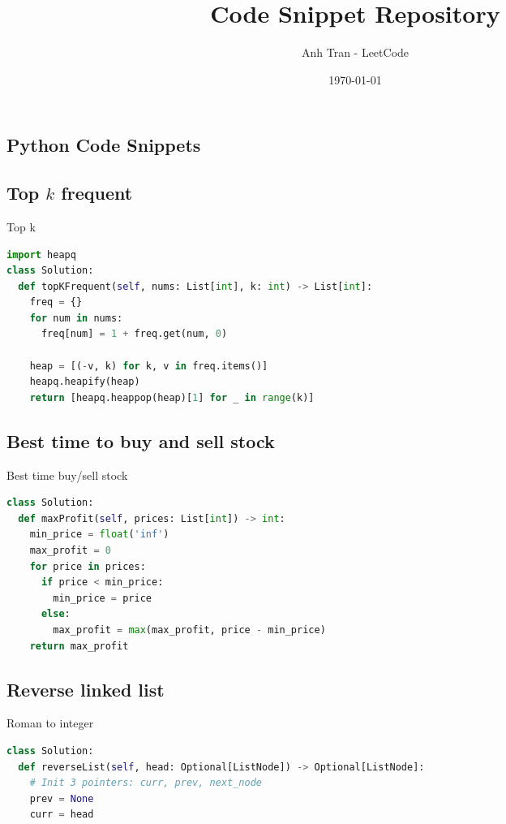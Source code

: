 \documentclass[a4paper,12pt]{article}
\title{Code Snippet Repository}
\author{Anh Tran - LeetCode}
\date{\today}
\begin{document}
\maketitle

\begin{multicols}{2}

\section{Python Code Snippets}

\subsection{Top $k$ frequent}

\begin{mycode}[label={lst:top-k}]{Top k}
\begin{lstlisting}[language=Python]
import heapq
class Solution:
  def topKFrequent(self, nums: List[int], k: int) -> List[int]:
    freq = {}
    for num in nums:
      freq[num] = 1 + freq.get(num, 0)

    heap = [(-v, k) for k, v in freq.items()]
    heapq.heapify(heap)
    return [heapq.heappop(heap)[1] for _ in range(k)]
\end{lstlisting}
\end{mycode}

\subsection{Best time to buy and sell stock}

\begin{mycode}[label={lst:best-time-buy-sell-stock}]{Best time buy/sell stock}
\begin{lstlisting}[language=Python]
class Solution:
  def maxProfit(self, prices: List[int]) -> int:
    min_price = float('inf')
    max_profit = 0
    for price in prices:
      if price < min_price:
        min_price = price
      else:
        max_profit = max(max_profit, price - min_price)
    return max_profit
\end{lstlisting}
\end{mycode}

\subsection{Reverse linked list}

\begin{mycode}[label={lst:roman-to-integer}]{Roman to integer}
\begin{lstlisting}[language=Python]
class Solution:
  def reverseList(self, head: Optional[ListNode]) -> Optional[ListNode]:
    # Init 3 pointers: curr, prev, next_node
    prev = None
    curr = head


\end{lstlisting}
\end{mycode}
\end{multicols}
\end{document}
